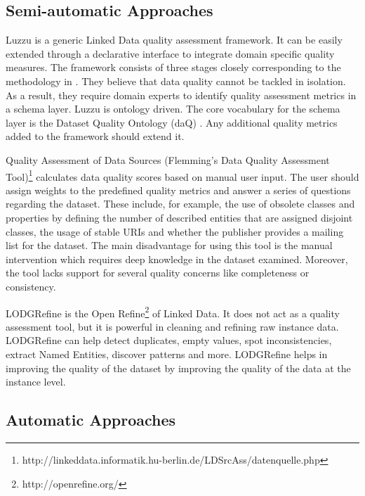 \documentclass[onecolumn, crcready]{iosart2c}
\begin{document}
\subsection{Semi-automatic Approaches}

Luzzu \cite{DBLP:journals/corr/DebattistaLLA14} is a generic Linked Data quality assessment framework. It can be easily extended through a declarative interface to integrate domain specific quality measures. The framework consists of three stages closely corresponding to the methodology in \cite{DBLP:conf/i-semantics/RulaZ14}. They believe that data quality cannot be tackled in isolation. As a result, they require domain experts to identify quality assessment metrics in a schema layer. Luzzu is ontology driven. The core vocabulary for the schema layer is the Dataset Quality Ontology (daQ) \cite{DBLP:conf/www/Debattista0A14}. Any additional quality metrics added to the framework should extend it.

Quality Assessment of Data Sources (Flemming's Data Quality Assessment Tool)\footnote{http://linkeddata.informatik.hu-berlin.de/LDSrcAss/datenquelle.php} calculates data quality scores based on manual user input. The user should assign weights to the predefined quality metrics and answer a series of questions regarding the dataset. These include, for example, the use of obsolete classes and properties by defining the number of described entities that are assigned disjoint classes, the usage of stable URIs and whether the publisher provides a mailing list for the dataset. The main disadvantage for using this tool is the manual intervention which requires deep knowledge in the dataset examined. Moreover, the tool lacks support for several quality concerns like completeness or consistency.

LODGRefine \cite{conf/i-semantics/Verlic12} is the Open Refine\footnote{http://openrefine.org/} of Linked Data. It does not act as a quality assessment tool, but it is powerful in cleaning and refining raw instance data. LODGRefine can help detect duplicates, empty values, spot inconsistencies, extract Named Entities, discover patterns and more. LODGRefine helps in improving the quality of the dataset by improving the quality of the data at the instance level.\\

\subsection{Automatic Approaches}
\end{document}
